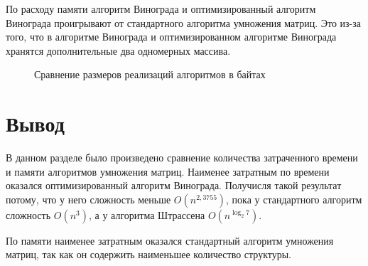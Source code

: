 По расходу памяти алгоритм Винограда и оптимизированный алгоритм Винограда проигрывают от стандартного алгоритма умножения матриц. 
Это из-за того, что в алгоритме Винограда и оптимизированном алгоритме Винограда хранятся дополнительные два одномерных массива. 

\begin{figure}[ht!]
	\begin{center}
		\captionsetup{singlelinecheck = false, justification=centerfirst}
		\centering
		\caption{Сравнение размеров реализаций алгоритмов в байтах}
		\label{fig:graph2}
	\end{center}
	
\end{figure}

\clearpage

\section*{Вывод}
В данном разделе было произведено сравнение количества затраченного времени и памяти алгоритмов умножения матриц. 
Наименее затратным по времени оказался оптимизированный алгоритм Винограда. 
Получисля такой результат потому, что у него сложность меньше $O(n^{2,3755})$, пока у стандартного алгоритм сложность $O(n^{3})$, а у алгоритма Штрассена $O(n^{\log _{2}7})$.

По памяти наименее затратным оказался стандартный алгоритм умножения матриц, так как он содержить наименьшее количество структуры.


